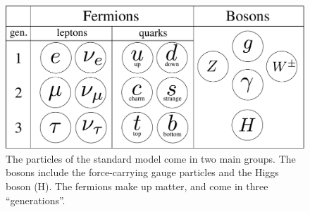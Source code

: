 \begin{figure}[!htb]
    \centering
    \includegraphics[width=.7\textwidth]{figurer/standard_model.pdf}
    \caption{
        The particles of the standard model come in two main groups.
        The bosons include the force-carrying gauge particles and the Higgs boson (H).
        The fermions make up matter, and come in three ``generations''.
    }
    \label{fig: standard model}
\end{figure}


